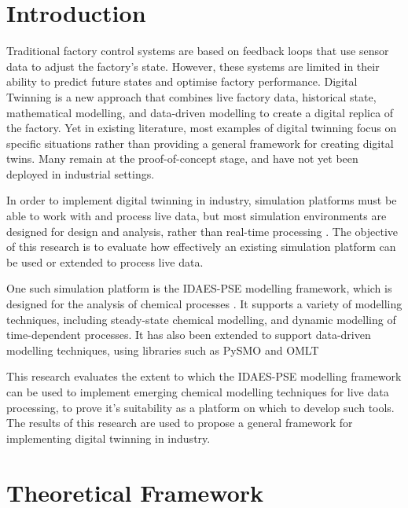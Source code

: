 \documentclass[12pt]{article}
\begin{document}
\section{Introduction}


Traditional factory control systems are based on feedback loops that use sensor data to adjust the factory's state. 
However, these systems are limited in their ability to predict future states and optimise factory performance. 
Digital Twinning is a new approach that combines live factory data, historical state, mathematical modelling, and data-driven modelling to create a digital replica of the factory. 
Yet in existing literature, most examples of digital twinning focus on specific situations rather than providing a general framework for creating digital twins.
Many remain at the proof-of-concept stage, and have not yet been deployed in industrial settings.

In order to implement digital twinning in industry, simulation platforms must be able to work with and process live data, but most simulation environments are designed for design and analysis, rather than real-time processing \cite{agi2024computational}. The objective of this research is to evaluate how effectively an existing simulation platform can be used or extended to process live data.

One such simulation platform is the IDAES-PSE modelling framework, which is designed for the analysis of chemical processes \cite{lee2021idaes}. 
It supports a variety of modelling techniques, including steady-state chemical modelling, and dynamic modelling of time-dependent processes. 
It has also been extended to support data-driven modelling techniques, using libraries such as PySMO and OMLT \cite{cecconOMLTOptimizationMachine2022} 


This research evaluates the extent to which the IDAES-PSE modelling framework can be used to implement emerging chemical modelling techniques for live data processing, to prove it's suitability as a platform on which to develop such tools.
The results of this research are used to propose a general framework for implementing digital twinning in industry.


\section{Theoretical Framework}\label{sec:theoretical_framework}
\end{document}
